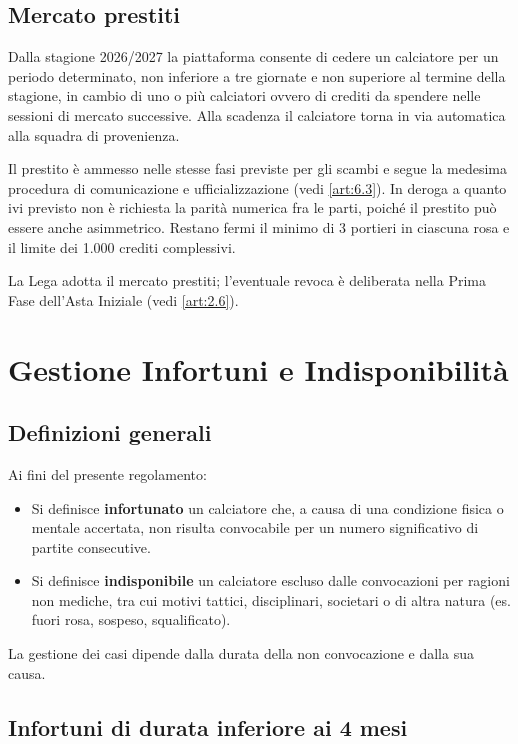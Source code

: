 \section{Mercato prestiti}
\label{art:6.5}

Dalla stagione 2026/2027 la piattaforma consente di cedere un calciatore per un periodo determinato, non inferiore a tre giornate e non superiore al termine della stagione, in cambio di uno o più calciatori ovvero di crediti da spendere nelle sessioni di mercato successive. Alla scadenza il calciatore torna in via automatica alla squadra di provenienza.

Il prestito è ammesso nelle stesse fasi previste per gli scambi e segue la medesima procedura di comunicazione e ufficializzazione (vedi \ref{art:6.3}). In deroga a quanto ivi previsto non è richiesta la parità numerica fra le parti, poiché il prestito può essere anche asimmetrico. Restano fermi il minimo di 3 portieri in ciascuna rosa e il limite dei 1.000 crediti complessivi.

La Lega adotta il mercato prestiti; l'eventuale revoca è deliberata nella Prima Fase dell'Asta Iniziale (vedi \ref{art:2.6}).


\chapter{Gestione Infortuni e Indisponibilità}
\label{cap:gestione-infortuni}

\section{Definizioni generali}
\label{art:7.1}

Ai fini del presente regolamento:

\begin{itemize}
\item Si definisce \textbf{infortunato} un calciatore che, a causa di una condizione fisica o mentale accertata, non risulta convocabile per un numero significativo di partite consecutive.
\item Si definisce \textbf{indisponibile} un calciatore escluso dalle convocazioni per ragioni non mediche, tra cui motivi tattici, disciplinari, societari o di altra natura (es. fuori rosa, sospeso, squalificato).
\end{itemize}

La gestione dei casi dipende dalla durata della non convocazione e dalla sua causa.

\section{Infortuni di durata inferiore ai 4 mesi}
\label{art:7.2}

